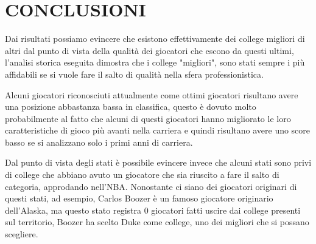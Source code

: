 \documentclass[10pt,a4paper,twocolumn]{article}
\begin{document}

\section{CONCLUSIONI}

Dai risultati possiamo evincere che esistono effettivamente dei college migliori di altri dal punto di vista della qualità dei giocatori che escono da questi ultimi, l'analisi storica eseguita dimostra che i college "migliori", sono stati sempre i più affidabili se si vuole fare il salto di qualità nella sfera professionistica.

Alcuni giocatori riconosciuti attualmente come ottimi giocatori risultano avere una posizione abbastanza bassa in classifica, questo è dovuto molto probabilmente al fatto che alcuni di questi giocatori hanno migliorato le loro caratteristiche di gioco più avanti nella carriera e quindi risultano avere uno score basso se si analizzano solo i primi anni di carriera.

Dal punto di vista degli stati è possibile evincere invece che alcuni stati sono privi di college che abbiano avuto un giocatore che sia riuscito a fare il salto di categoria, approdando nell'NBA. Nonostante ci siano dei giocatori originari di questi stati, ad esempio, Carlos Boozer è un famoso giocatore originario dell'Alaska, ma questo stato registra 0 giocatori fatti uscire dai college presenti sul territorio, Boozer ha scelto Duke come college, uno dei migliori che si possano scegliere.
\end{document}
